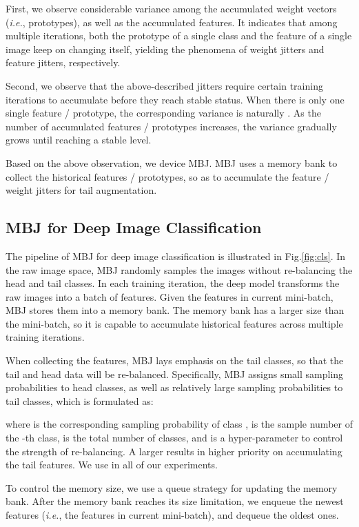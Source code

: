 \documentclass[final]{cvpr}
\def\ie{\textit{i.e.}}
\begin{document}
First, we observe considerable variance among the accumulated weight vectors (\ie, prototypes), as well as the accumulated features. It indicates that among multiple iterations, both the prototype of a single class and the feature of a single image keep on changing itself, yielding the phenomena of weight jitters and feature jitters, respectively. 

Second, we observe that the above-described jitters require certain training iterations to accumulate before they reach stable status. When there is only one single feature / prototype, the corresponding variance is naturally . As the number of accumulated features / prototypes increases, the variance gradually grows until reaching a stable level. 

Based on the above observation, we device MBJ. MBJ uses a memory bank to collect the historical features / prototypes, so as to accumulate the feature / weight jitters for tail augmentation. 

 
\subsection{MBJ for Deep Image Classification}\label{sec:cls}



The pipeline of MBJ for deep image classification is illustrated in Fig.\ref{fig:cls}. In the raw image space, MBJ randomly samples the images without re-balancing the head and tail classes. In each training iteration, the deep model transforms the raw images into a batch of features. Given the features in current mini-batch, MBJ stores them into a memory bank.
The memory bank has a larger size than the mini-batch, so it is capable to accumulate historical features across multiple training iterations. 

When collecting the features, MBJ lays emphasis on the tail classes, so that the tail and head data will be re-balanced. Specifically, MBJ assigns small sampling probabilities to head classes, as well as relatively large sampling probabilities to tail classes, which is formulated as:


where  is the corresponding sampling probability of class ,  is the sample number of the -th class,  is the total number of classes,  and  is a hyper-parameter to control the strength of re-balancing. A larger  results in higher priority on accumulating the tail features. We use  in all of our experiments.

To control the memory size, we use a queue strategy for updating the memory bank. After the memory bank reaches its size limitation, we enqueue the newest features (\ie, the features in current mini-batch), and dequeue the oldest ones.
\end{document}

